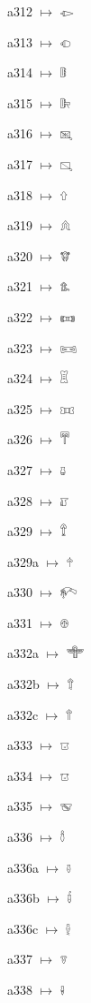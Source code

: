 {\noindent a312 $\mapsto$ {\ahfont 𔕟}\par
\noindent a313 $\mapsto$ {\ahfont 𔕠}\par
\noindent a314 $\mapsto$ {\ahfont 𔕡}\par
\noindent a315 $\mapsto$ {\ahfont 𔕢}\par
\noindent a316 $\mapsto$ {\ahfont 𔕣}\par
\noindent a317 $\mapsto$ {\ahfont 𔕤}\par
\noindent a318 $\mapsto$ {\ahfont 𔕥}\par
\noindent a319 $\mapsto$ {\ahfont 𔕦}\par
\noindent a320 $\mapsto$ {\ahfont 𔕧}\par
\noindent a321 $\mapsto$ {\ahfont 𔕨}\par
\noindent a322 $\mapsto$ {\ahfont 𔕩}\par
\noindent a323 $\mapsto$ {\ahfont 𔕪}\par
\noindent a324 $\mapsto$ {\ahfont 𔕫}\par
\noindent a325 $\mapsto$ {\ahfont 𔕬}\par
\noindent a326 $\mapsto$ {\ahfont 𔕭}\par
\noindent a327 $\mapsto$ {\ahfont 𔕮}\par
\noindent a328 $\mapsto$ {\ahfont 𔕯}\par
\noindent a329 $\mapsto$ {\ahfont 𔕰}\par
\noindent a329a $\mapsto$ {\ahfont 𔕱}\par
\noindent a330 $\mapsto$ {\ahfont 𔕲}\par
\noindent a331 $\mapsto$ {\ahfont 𔕳}\par
\noindent a332a $\mapsto$ {\ahfont 𔕴}\par
\noindent a332b $\mapsto$ {\ahfont 𔕵}\par
\noindent a332c $\mapsto$ {\ahfont 𔕶}\par
\noindent a333 $\mapsto$ {\ahfont 𔕷}\par
\noindent a334 $\mapsto$ {\ahfont 𔕸}\par
\noindent a335 $\mapsto$ {\ahfont 𔕹}\par
\noindent a336 $\mapsto$ {\ahfont 𔕺}\par
\noindent a336a $\mapsto$ {\ahfont 𔕻}\par
\noindent a336b $\mapsto$ {\ahfont 𔕼}\par
\noindent a336c $\mapsto$ {\ahfont 𔕽}\par
\noindent a337 $\mapsto$ {\ahfont 𔕾}\par
\noindent a338 $\mapsto$ {\ahfont 𔕿}\par
}
